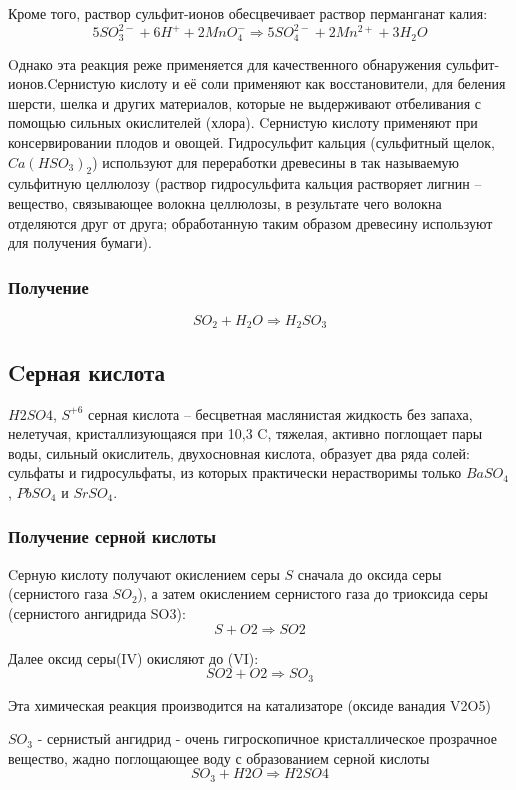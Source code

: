 \documentclass[11pt]{article}
\begin{document}
Кроме того, раствор сульфит-ионов обесцвечивает раствор перманганат калия:
$$5SO_3^{2-} +6H ^+ + 2MnO_4^- \Rightarrow 5SO_4^{2-} + 2Mn^{2+} +3H_2O$$

Oднако эта реакция реже применяется для качественного обнаружения сульфит-ионов.Cернистую кислоту и
её соли применяют как восстановители, для беления шерсти, шелка и других материалов, которые не
выдерживают отбеливания с помощью сильных окислителей (хлора). Cернистую кислоту применяют при
консервировании плодов и овощей. Гидросульфит кальция (сульфитный щелок, $Ca(HSO_3)_2$)
используют для
переработки древесины в так называемую сульфитную целлюлозу (раствор гидросульфита кальция
растворяет лигнин – вещество, связывающее волокна целлюлозы, в результате чего волокна отделяются друг
от друга; обработанную таким образом древесину используют для получения бумаги).

\subsubsection{Получение} 
$$SO_2 + H_2O \Rightarrow H_2SO_3$$

\subsection{Cерная кислота}
$H2SO4$, $S^{+6}$
серная кислота – бесцветная маслянистая жидкость без запаха, нелетучая, кристаллизующаяся
при 10,3 C, тяжелая, активно поглощает пары воды, сильный окислитель, двухосновная кислота, образует два
ряда солей: сульфаты и гидросульфаты, из которых практически нерастворимы только $BaSO_4$, $PbSO_4$ и $SrSO_4$.
\subsubsection{Получение серной кислоты}
Cерную кислоту получают окислением серы $S$ сначала до оксида серы (сернистого газа $SO_2$), а затем окислением сернистого газа до триоксида серы (сернистого ангидрида SO3):
$$S + O2 \Rightarrow SO2$$

Далее оксид серы(IV) окисляют до (VI):
$$SO2 + O2 \Rightarrow SO_3$$

Эта химическая реакция производится на катализаторе (оксиде ванадия V2O5)

$SO_3$ - сернистый
ангидрид - очень гигроскопичное кристаллическое прозрачное вещество, жадно поглощающее воду с
образованием серной кислоты
$$SO_3 + H2O \Rightarrow H2SO4$$
\end{document}
